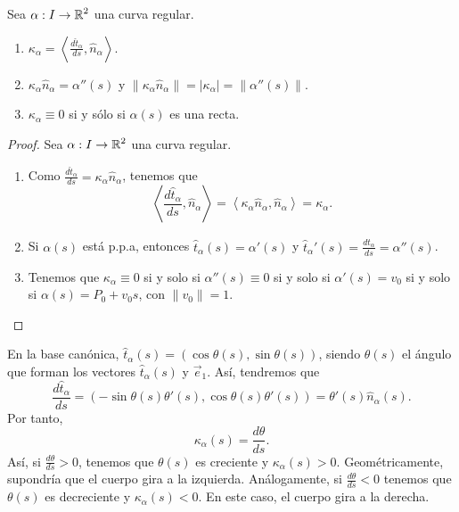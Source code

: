 \begin{prop}
Sea $\displaystyle \alpha : I \to \mathbb{R}^{2} $ una curva regular.
\begin{enumerate}
\item $\displaystyle \kappa_{\alpha }=\left\langle \frac{d\hat{t}_{\alpha }}{d s}, \hat{n}_{\alpha } \right\rangle $. 
\item $\displaystyle \kappa_{\alpha }\hat{n}_{\alpha }=\alpha''\left(s\right)$ y $ \|\kappa_{\alpha }\hat{n}_{\alpha }\|= \left|\kappa_{\alpha}\right| = \|\alpha''\left(s\right)\| $.
\item $\displaystyle \kappa_{\alpha } \equiv 0 $ si y sólo si $\displaystyle \alpha\left(s\right) $ es una recta.
\end{enumerate}
\end{prop}
\begin{proof}
Sea $\displaystyle \alpha : I \to \mathbb{R}^{2} $ una curva regular.
\begin{enumerate}
\item Como $\displaystyle \frac{d\hat{t}_{\alpha }}{d s}= \kappa_{\alpha }\hat{n}_{\alpha } $, tenemos que 
	\[\left\langle \frac{d\hat{t}_{\alpha }}{d s}, \hat{n}_{\alpha } \right\rangle =\left\langle \kappa_{\alpha }\hat{n}_{\alpha }, \hat{n}_{\alpha } \right\rangle =\kappa_{\alpha } .\]
\item Si $\displaystyle \alpha\left(s\right) $ está p.p.a, entonces $\displaystyle \hat{t}_{\alpha }\left(s\right)=\alpha'\left(s\right) $ y $\displaystyle \hat{t}_{\alpha}'\left(s\right)=\frac{d\hat{t}_{\alpha }}{d s}=\alpha''\left(s\right) $.
\item Tenemos que $\displaystyle \kappa_{\alpha }\equiv 0 $ si y solo si $\displaystyle \alpha''\left(s\right)\equiv 0 $ si y solo si $\displaystyle \alpha'\left(s\right)=v_{0} $ si y solo si $\displaystyle \alpha\left(s\right)=P_{0} + v_{0}s $, con $\displaystyle \|v_{0}\| = 1 $.
\end{enumerate}
\end{proof}
\begin{observation}
En la base canónica, $\displaystyle \hat{t}_{\alpha }\left(s\right)=\left(\cos\theta\left(s\right), \sin\theta\left(s\right)\right) $, siendo $\displaystyle \theta\left(s\right) $ el ángulo que forman los vectores $\displaystyle \hat{t}_{\alpha }\left(s\right) $ y $\displaystyle \vec{e}_{1} $. Así, tendremos que 
	\[\frac{d\hat{t}_{\alpha }}{d s}=\left(-\sin\theta\left(s\right)\theta'\left(s\right), \cos\theta\left(s\right)\theta'\left(s\right)\right) = \theta'\left(s\right)\hat{n}_{\alpha }\left(s\right) .\]
Por tanto, 
\[\kappa_{\alpha }\left(s\right)=\frac{d\theta }{d s} .\]
Así, si $\displaystyle \frac{d\theta }{d s} > 0 $, tenemos que $\displaystyle \theta\left(s\right) $ es creciente y $\displaystyle \kappa_{\alpha }\left(s\right) > 0 $. Geométricamente, supondría que el cuerpo gira a la izquierda. Análogamente, si $\displaystyle \frac{ d\theta }{d s} < 0 $ tenemos que $\displaystyle \theta\left(s\right) $ es decreciente y $\displaystyle \kappa_{\alpha }\left(s\right) < 0 $. En este caso, el cuerpo gira a la derecha. 
\end{observation}

